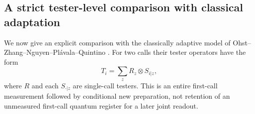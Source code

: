 \subsection{A strict tester-level comparison with classical adaptation}
We now give an explicit comparison with the classically adaptive
model of Ohst--Zhang--Nguyen--Pl\'avala--Quintino
\cite[Definition~23 and (64)]{OZNPQ89}.  For two calls their tester
operators have the form
\begin{equation}\label{eq:catester89}
 T_i=\sum_z R_z\otimes S_{i|z},
\end{equation}
where $R$ and each $S_{\cdot|z}$ are single-call testers.  This is
an entire first-call measurement followed by conditional new
preparation, not retention of an unmeasured first-call quantum
register for a later joint readout.

